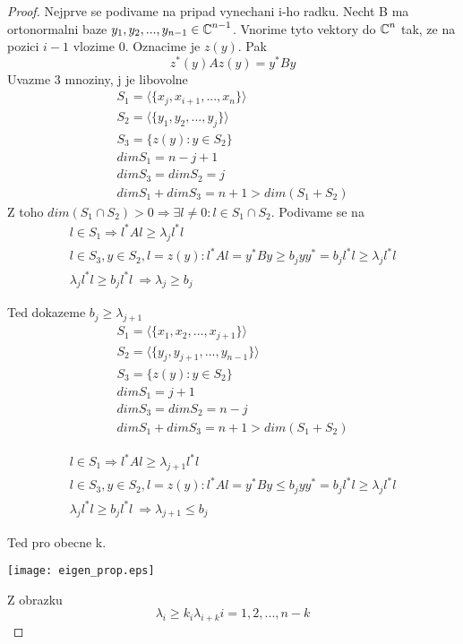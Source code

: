 \begin{proof}
	Nejprve se podivame na pripad vynechani i-ho radku.
	Necht B ma ortonormalni baze $y_1, y_2, ..., y_{n-1} \in \operatorname{\mathbb{C}}^{n - 1}$. Vnorime tyto vektory do $\operatorname{\mathbb{C}}^n$ tak, ze na pozici $i - 1$ vlozime 0.
	Oznacime je $z(y)$.
	Pak
	\[ z^{\ast}(y)Az(y) = y^{\ast}By \]
Uvazme 3 mnoziny, j je libovolne
	\begin{gather*}
		S_1 = \langle\{x_j, x_{i+1},..., x_n\} \rangle \\
		S_2 = \langle\{y_1, y_2,..., y_j\} \rangle \\
		S_3 = \{z(y): y \in S_2 \} \\
		dim S_1 = n - j + 1 \\
		dim S_3 = dim S_2 = j \\
		dim S_1 + dim S_3 = n+1 > dim (S_1 + S_2)
	\end{gather*}
	Z toho $dim(S_1 \cap S_2) > 0 \Rightarrow \exists l \ne 0 : l \in S_1 \cap S_2$.
	Podivame se na
	\begin{gather*}
		l \in S_1 \Rightarrow l^{\ast}Al \geq \lambda_j l^{\ast}l \\
		l \in S_3, y \in S_2, l = z(y): l^{\ast}Al = y^{\ast}By \geq b_j y y^{\ast} = b_j l^{\ast} l \geq \lambda_j l^{\ast}l \\
		\lambda_j l^{\ast}l \geq b_j l^{\ast}l\ \Rightarrow \lambda_j \geq b_j
	\end{gather*}

	Ted dokazeme $ b_j \geq \lambda_{j + 1} $
	\begin{gather*}
		S_1 = \langle\{x_1, x_2,..., x_{j+1}\} \rangle \\
		S_2 = \langle\{y_j, y_{j+1},..., y_{n-1}\} \rangle \\
		S_3 = \{z(y): y \in S_2 \} \\
		dim S_1 = j + 1 \\
		dim S_3 = dim S_2 = n - j \\
		dim S_1 + dim S_3 = n+1 > dim (S_1 + S_2)
	\end{gather*}

	\begin{gather*}
		l \in S_1 \Rightarrow l^{\ast}Al \geq \lambda_{j + 1} l^{\ast}l \\
		l \in S_3, y \in S_2, l = z(y): l^{\ast}Al = y^{\ast}By \leq b_j y y^{\ast} = b_j l^{\ast} l \geq \lambda_j l^{\ast}l \\
		\lambda_j l^{\ast}l \geq b_j l^{\ast}l\ \Rightarrow \lambda_{j + 1} \leq b_j
	\end{gather*}

	Ted pro obecne k.

	\texttt{[image: eigen\_prop.eps]}

	Z obrazku
	\[ \lambda_i \geq k_i \lambda_{i + k} i = 1,2,..., n-k  \]

\end{proof}

